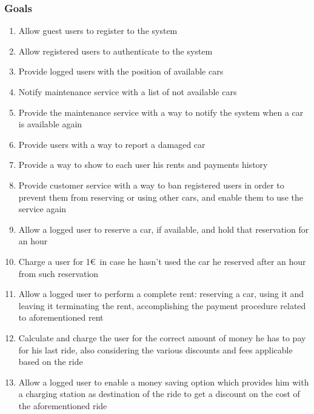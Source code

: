 	\subsubsection{Goals}
	\begin{enumerate}[label=\textbf{G\arabic*}]
		\item \label{goal:register} Allow guest users to register to the system
		\item \label{goal:login}Allow registered users to authenticate to the system
		\item \label{goal:position}Provide logged users with the position of available cars
		\item \label{goal:notifyMaintenance} Notify maintenance service with a list of not available cars 
		\item \label{goal:maintenanceDone} Provide the maintenance service with a way to notify the system when a car is available again 
		\item \label{goal:needMaintenance} Provide users with a way to report a damaged car
		\item \label{goal:usersHistory} Provide a way to show to each user his rents and payments history
		\item \label{goal:banUnbanUsers} Provide customer service with a way to ban registered users in order to prevent them from reserving or using other cars, and enable them to use the service again
		\item \label{goal:carReservation} Allow a logged user to reserve a car, if available, and hold that reservation for an hour
		\item \label{goal:reservationFee} Charge a user for 1\euro\ in case he hasn't used the car he reserved after an hour from such reservation
		\item \label{goal:completeRent} Allow a logged user to perform a complete rent: reserving a car, using it and leaving it terminating the rent, accomplishing the payment procedure related to aforementioned rent
		\item \label{goal:calculateCost} Calculate and charge the user for the correct amount of money he has to pay for his last ride, also considering the various discounts and fees applicable based on the ride
		\item \label{goal:moneySavingOption}Allow a logged user to enable a money saving option which provides him with a charging station as destination of the ride to get a discount on the cost of the aforementioned ride
	\end{enumerate}

